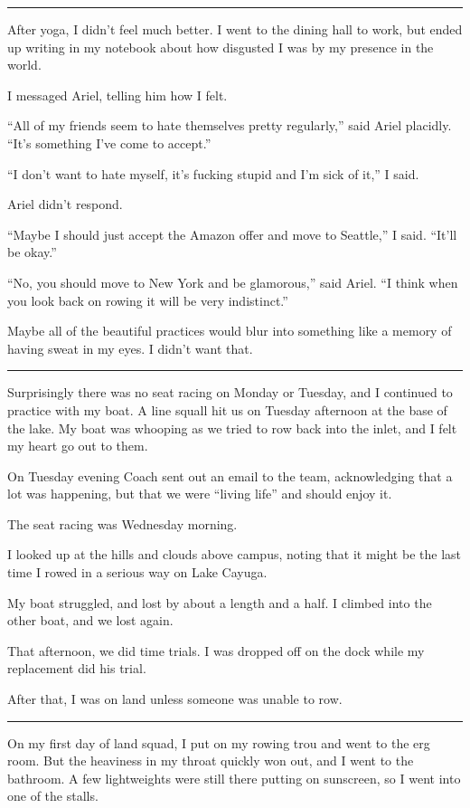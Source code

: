\plainfancybreak{12pt}{2}{}

After yoga, I didn't feel much better.  I went to the dining hall to work, but
ended up writing in my notebook about how disgusted I was by my presence in the
world.

I messaged Ariel, telling him how I felt.

``All of my friends seem to hate themselves pretty regularly,'' said Ariel
placidly.  ``It's something I've come to accept.''

``I don't want to hate myself, it's fucking stupid and I'm sick of it,'' I said.  

Ariel didn't respond.

``Maybe I should just accept the Amazon offer and move to Seattle,'' I said.
``It'll be okay.''

``No, you should move to New York and be glamorous,'' said Ariel.  ``I think
when you look back on rowing it will be very indistinct.'' 

Maybe all of the beautiful practices would blur into something like a memory of
having sweat in my eyes.  I didn't want that.

\plainfancybreak{12pt}{2}{}

Surprisingly there was no seat racing on Monday or Tuesday, and I continued to
practice with my boat.  A line squall hit us on Tuesday afternoon at the base of
the lake.  My boat was whooping as we tried to row back into the inlet, and I
felt my heart go out to them.

On Tuesday evening Coach sent out an email to the team,  acknowledging that a
lot was happening, but that we were ``living life'' and should enjoy it.

The seat racing was Wednesday morning.  

I looked up at the hills and clouds above campus, noting that it might be the
last time I rowed in a serious way on Lake Cayuga.

My boat struggled, and lost by about a length and a half.  I climbed into the
other boat, and we lost again.

That afternoon, we did time trials.  I was dropped off on the dock while my
replacement did his trial. 

After that, I was on land unless someone was unable to row.
 
\plainfancybreak{12pt}{2}{}

On my first day of land squad, I put on my rowing trou and went to the erg room.
But the heaviness in my throat quickly won out, and I went to the bathroom.  A
few lightweights were still there putting on sunscreen, so I went into one of
the stalls.  

